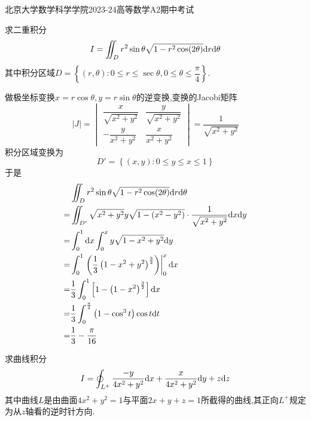 \documentclass{ctexart}
\begin{document}
\pagestyle{empty}
\begin{center}\Large
    北京大学数学科学学院2023-24高等数学A2期中考试
\end{center}
\begin{problem}[1.(20\songti{分})]
    求二重积分
    \[I=\iint_{D}r^2\sin\theta\sqrt{1-r^2\cos(2\theta)}\mathrm{d} r\mathrm{d}\theta\]
    其中积分区域$D=\left\{(r,\theta):0\leqslant r\leqslant\sec\theta,0\leqslant\theta\leqslant\dfrac\pi4\right\}$.
\end{problem}
\begin{solution}
    做极坐标变换$x=r\cos\theta,y=r\sin\theta$的逆变换,变换的Jacobi矩阵
    \[|J|=\begin{vmatrix}
        \dfrac{x}{\sqrt{x^2+y^2}}&\dfrac{y}{\sqrt{x^2+y^2}}\\
        -\dfrac{y}{x^2+y^2}&\dfrac{x}{x^2+y^2}
    \end{vmatrix}=\dfrac{1}{\sqrt{x^2+y^2}}\]
    积分区域变换为
    \[D'=\left\{(x,y):0\leqslant y\leqslant x\leqslant 1\right\}\]
    于是
    \[\begin{aligned}
        &\iint_{D}r^2\sin\theta\sqrt{1-r^2\cos(2\theta)}\mathrm{d} r\mathrm{d}\theta\\
        =&\iint_{D'}\sqrt{x^2+y^2}y\sqrt{1-\left(x^2-y^2\right)}\cdot\dfrac{1}{\sqrt{x^2+y^2}}\mathrm{d} x\mathrm{d} y \\
        =&\int_0^1\mathrm{d} x\int_0^xy\sqrt{1-x^2+y^2}\mathrm{d} y \\
        =&\int_0^1\left.\left(\dfrac13\left(1-x^2+y^2\right)^{\frac32}\right)\right|_0^x\mathrm{d} x \\
        =&\dfrac13\int_0^1\left[1-\left(1-x^2\right)^{\frac32}\right]\mathrm{d} x \\
        =&\dfrac13\int_0^{\frac{\pi}{2}}\left(1-\cos^3t\right)\cos t\mathrm{d} t \\
        =&\dfrac13-\dfrac{\pi}{16}
    \end{aligned}\]

\end{solution}
\begin{problem}[2.(20\songti{分})]
    求曲线积分
    \[I=\oint_{L^+}\dfrac{-y}{4x^2+y^2}\mathrm{d} x+\dfrac{x}{4x^2+y^2}\mathrm{d} y+z\mathrm{d} z\]
    其中曲线$L$是由曲面$4x^2+y^2=1$与平面$2x+y+z=1$所截得的曲线,其正向$L^+$规定为从$z$轴看的逆时针方向.
\end{problem}
\end{document}
